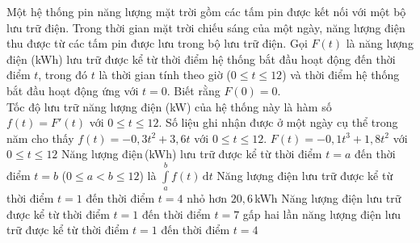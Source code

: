 \begin{ex}%
	Một hệ thống pin năng lượng mặt trời gồm các tấm pin được kết nối với một bộ lưu trữ điện. Trong thời gian mặt trời chiếu sáng của một ngày, năng lượng điện thu được từ các tấm pin được lưu trong bộ lưu trữ điện. Gọi $F(t)$ là năng lượng điện (kWh) lưu trữ được kể từ thời điểm hệ thống bắt đầu hoạt động đến thời điểm $t$, trong đó $t$ là thời gian tính theo giờ ($0\le t\le 12$) và thời điểm hệ thống bắt đầu hoạt động ứng với $t=0$. Biết rằng $F(0)=0$.\\
	Tốc độ lưu trữ năng lượng điện (kW) của hệ thống này là hàm số $f(t)=F'(t)$ với $0\le t\le 12$. Số liệu ghi nhận được ở một ngày cụ thể trong năm cho thấy $f(t)=-0{,}3t^2+3{,}6t$ với $0\le t\le 12$.
	\choiceTF
		{\True $F(t)=-0{,}1t^3+1{,}8t^2$ với $0\le t\le 12$}
		{\True Năng lượng điện\,(kWh) lưu trữ được kể từ thời điểm $t=a$ đến thời điểm $t=b$ ($0\le a<b\le 12$) là $\displaystyle\int\limits_a^b f(t)\mathrm{\,d}t$}
		{Năng lượng điện lưu trữ được kể từ thời điểm $t=1$ đến thời điểm $t=4$ nhỏ hơn $20{,}6$\,kWh}
		{Năng lượng điện lưu trữ được kể từ thời điểm $t=1$ đến thời điểm $t=7$ gấp hai lần năng lượng điện lưu trữ được kể từ thời điểm $t=1$ đến thời điểm $t=4$}
\end{ex}


